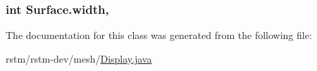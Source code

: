\hypertarget{classSurface_a484eb0caa3698d2aa98b8a4113f408e5}{
\subsubsection[{width}]{\setlength{\rightskip}{0pt plus 5cm}int Surface.\-width\hspace{0.3cm}{\ttfamily [static]}, {\ttfamily [private]}}}\label{classSurface_a484eb0caa3698d2aa98b8a4113f408e5}


The documentation for this class was generated from the following file\-:\begin{DoxyCompactItemize}
\item 
rstm/rstm-\/dev/mesh/\hyperlink{Display_8java}{Display.\-java}\end{DoxyCompactItemize}
